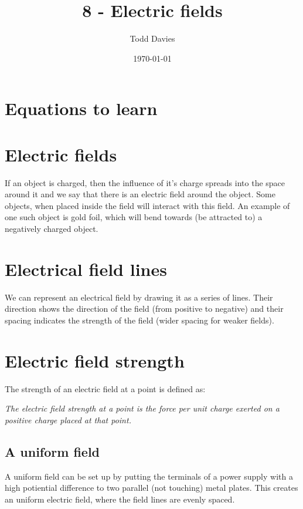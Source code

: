 \documentclass{article}
\title{8 - Electric fields}
\author{Todd Davies}
\date{\today}
\begin{document}
\lhead{\today}

\maketitle

\section*{Equations to learn}
\thispagestyle{empty}


\section*{Electric fields}

If an object is charged, then the influence of it's charge spreads into the
space around it and we say that there is an electric field around the object.
Some objects, when placed inside the field will interact with this field. An
example of one such object is gold foil, which will bend towards (be attracted
to) a negatively charged object.

\section*{Electrical field lines}

We can represent an electrical field by drawing it as a series of lines. Their
direction shows the direction of the field (from positive to negative) and their
spacing indicates the strength of the field (wider spacing for weaker fields).

\section*{Electric field strength}

The strength of an electric field at a point is defined as:

{\it The electric field strength at a point is the force per unit charge exerted
on a positive charge placed at that point.}

\subsection*{A uniform field}

A uniform field can be set up by putting the terminals of a power supply with a
high potiential difference to two parallel (not touching) metal plates. This
creates an uniform electric field, where the field lines are evenly spaced.
\end{document}
